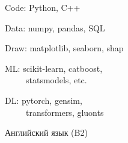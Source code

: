 \documentclass[11pt]{spidercv}
\begin{document}
    \begin{SideBar}{\ColorBackground}{\ColorTextSide}
        
        \begin{ItemList}{\ColorHighlight}
            \item [\faCode]Code: Python, C++
            \item [\faDatabase]Data: numpy, pandas, SQL
            \item [\faBarChartO]Draw: matplotlib, seaborn, shap
            \item [\faSpinner]ML: scikit-learn, catboost,\\ \ \ \ \ \ statsmodels, etc.
            \item [\faConnectdevelop]DL: pytorch, gensim,\\ \ \ \ \ \ transformers, gluonts
            \item [\faLanguage]Английский язык (B2)
        \end{ItemList}

        \vspace*{0.4cm}
        


        \vspace*{0.7cm}


        \begin{SpiderDiagram}{\ColorTextSide}{\ColorHighlight}
            
        \end{SpiderDiagram}

        \vspace*{0.9cm}

            
        \begin{SkillGauges}{\ColorHighlight}
        \end{SkillGauges}
        
    \end{SideBar}
\end{document}
